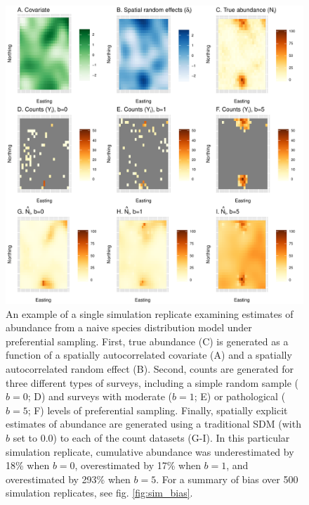 \documentclass[times,mee,doublespace,]{besauth2}
\begin{document}
\begin{figure} %
\begin{center}
\includegraphics[width=170mm]{Pref_samp_sim_maps.pdf}
\caption{An example of a single simulation replicate examining estimates of abundance from a naive species distribution model under preferential sampling.  First, true abundance (C) is generated as a function of a spatially autocorrelated covariate (A) and a spatially autocorrelated random effect (B). Second, counts are generated for three different types of surveys, including a simple random sample ($b=0$; D) and surveys with moderate ($b=1$; E) or pathological ($b=5$; F) levels of preferential sampling.  Finally, spatially explicit estimates of abundance are generated using a traditional SDM (with $b$ set to 0.0) to each of the count datasets (G-I).  In this particular simulation replicate, cumulative abundance was underestimated by 18\% when $b=0$, overestimated by 17\% when $b=1$, and overestimated by 293\% when $b=5$.  For a summary of bias over 500 simulation replicates, see fig. \ref{fig:sim_bias}.}
\label{fig:PS_sims}
\end{center}
\end{figure}
\end{document}

